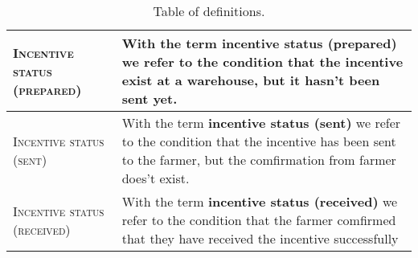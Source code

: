 \begin{table}[H]
\begin{tabular}{|m{}|m{}|}
        \hline
        \textsc{Incentive status (prepared)}     &   With the term \textbf{incentive status (prepared)} we refer to the condition that the incentive exist at a warehouse, but it hasn't been sent yet. \\
        \hline
        \textsc{Incentive status (sent)}     &   With the term \textbf{incentive status (sent)} we refer to the condition that the incentive has been sent to the farmer, but the comfirmation from farmer does't exist. \\
        \hline
        \textsc{Incentive status (received)}     &   With the term \textbf{incentive status (received)} we refer to the condition that the farmer comfirmed that they have received the incentive successfully \\
        \hline
    \end{tabular}
    
    \caption{\label{tab:def_table}Table of definitions.}
    
\end{table}

